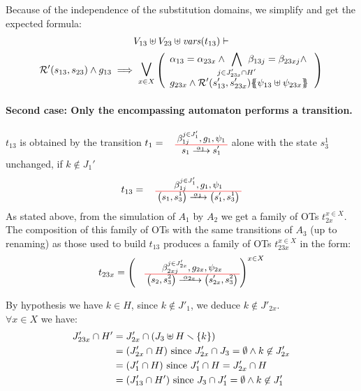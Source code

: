 \documentclass[runningheads]{llncs}
\begin{document}
\begin{enumerate}
Because of the independence of the substitution domains, we simplify and get the expected formula:
	\begin{multline*}
  V_{13} \uplus V_{23} \uplus \fvars{t_{13}} \vdash\\ \mathcal{R}^{\prime}\mpar{s_{13}, s_{23}} \wedge g_{13} \implies \operatorname*{\bigsymb{\bigvee}}_{x \in X} \mpar{\everymath{\displaystyle}\begin{array}{l}
			\alpha_{13} = \alpha_{23x} \wedge \bigwedge_\subbox{j \in J'_{23x} \cap H'} \beta_{13j} = \beta_{23xj} \nwedge\\[12pt]
			 g_{23x} \wedge \mathcal{R}^{\prime}\mpar{s'_{13}, s'_{23x}}\psubst{\psi_{13} \uplus \psi_{23x}}
		\end{array}} 
	\end{multline*}
	
\smallskip

\paragraph{Second case: Only the encompassing automaton performs a transition.}
 $t_{13}$ is obtained  by  the transition $t_1=\OTx{1}{}{1}{1}$ alone with the state $s^1_3$ unchanged, if $k \not\in J_1'$
\[t_{13} = \OT{\mpar{s_1, s^1_3}}{\mpar{s'_1, s^1_3}}{\alpha_1}{\beta_{1j}^{j \in J'_1}}{g_1}{\psi_1}
\]
As stated above, from the simulation of $A_1$ by $A_2$ we get a  family of OTs $t_{2x}^{x\in X}$. The composition of this family of OTs 
 with the same transitions of $A_3$ (up to renaming) as those used to build $t_{13}$ 
produces  a family of OTs $t_{23x}^{x\in X}$ in the form:
\[t_{23x} = \left(
\OT{\mpar{s_2, s^2_3}}{\mpar{s'_{2x}, s^2_3}}{\alpha_{2x}}{\beta_{2xj}^{j \in J'_{2x}}}{g_{2x}}{\psi_{2x}} \right)^{x\in X}\]

By hypothesis we have   $k \in H$, since $k \not\in J'_{1}$,  we deduce $k \not\in J'_{2x}$. \\
$\forall x \in X$ we have:
\begin{align*}		
J'_{23x} \cap H' & = J'_{2x}  \cap {\left(J_3 \uplus H \smallsetminus{\left\{k\right\}}\right)} \\
& = {\left(J'_{2x}\cap H \right)} \text{ since } J'_{2x}\cap J_3=\emptyset \land k\not\in J'_{2x} \\
& = {\left(J'_1\cap H \right)} \text{  since } J'_1 \cap H = J'_{2x} \cap H\\
& = {\left(J'_{13}\cap H' \right)} \text{ since } J_3\cap J'_1=\emptyset \land k\not\in J_1'
\end{align*}



\end{enumerate}
\end{document}
